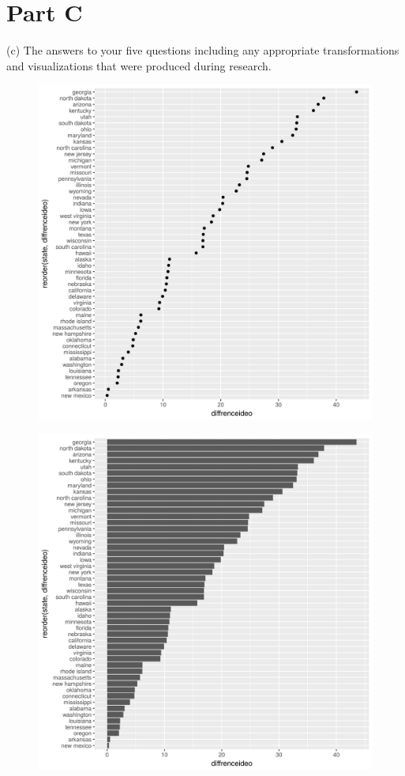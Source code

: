 \documentclass[11pt]{article}
\begin{document}
\section{Part C}
(c) The answers to your five questions including any appropriate transformations and visualizations that were produced during research.\\
\begin{figure}[ht!]
\includegraphics[scale = .5]{graph1.png}
\centering
\end{figure}

\begin{figure}[ht!]
\includegraphics[scale = .5]{graph2.png}
\centering
\end{figure}
\end{document}
